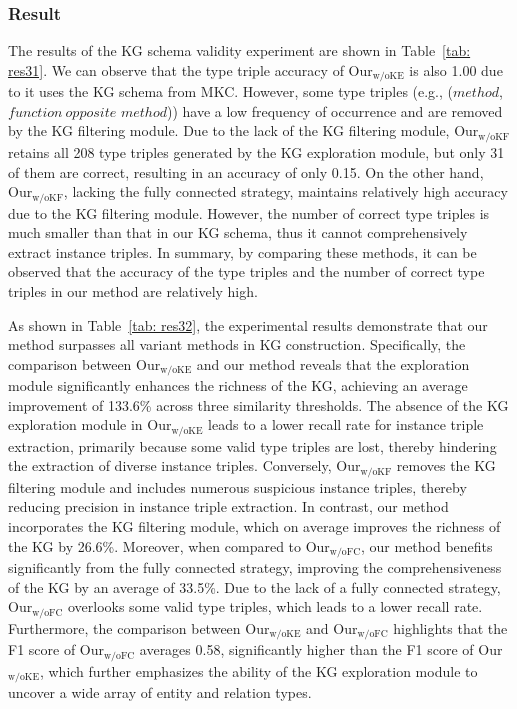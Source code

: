 \subsubsection{Result}
The results of the KG schema validity experiment are shown in Table~\ref{tab: res31}.
We can observe that the type triple accuracy of Our$_{\text{w/oKE}}$ is also 1.00 due to it uses the KG schema from MKC.
However, some type triples (e.g., ($method$, $function\ opposite$ $method$)) have a low frequency of occurrence and are removed by the KG filtering module. 
Due to the lack of the KG filtering module, Our$_{\text{w/oKF}}$ retains all 208 type triples generated by the KG exploration module, but only 31 of them are correct, resulting in an accuracy of only 0.15.
On the other hand, Our$_{\text{w/oKF}}$, lacking the fully connected strategy, maintains relatively high accuracy due to the KG filtering module.
However, the number of correct type triples is much smaller than that in our KG schema, thus it cannot comprehensively extract instance triples.
In summary, by comparing these methods, it can be observed that the accuracy of the type triples and the number of correct type triples in our method are relatively high.

As shown in Table~\ref{tab: res32}, the experimental results demonstrate that our method surpasses all variant methods in KG construction.
Specifically, the comparison between Our$_{\text{w/oKE}}$ and our method reveals that the exploration module significantly enhances the richness of the KG, achieving an average improvement of 133.6\% across three similarity thresholds.
The absence of the KG exploration module in Our$_{\text{w/oKE}}$ leads to a lower recall rate for instance triple extraction, primarily because some valid type triples are lost, thereby hindering the extraction of diverse instance triples.
Conversely, Our$_{\text{w/oKF}}$ removes the KG filtering module and includes numerous suspicious instance triples, thereby reducing precision in instance triple extraction.
In contrast, our method incorporates the KG filtering module, which on average improves the richness of the KG by 26.6\%.
Moreover, when compared to Our$_{\text{w/oFC}}$, our method benefits significantly from the fully connected strategy, improving the comprehensiveness of the KG by an average of 33.5\%.
Due to the lack of a fully connected strategy, Our$_{\text{w/oFC}}$ overlooks some valid type triples, which leads to a lower recall rate.
Furthermore, the comparison between Our$_{\text{w/oKE}}$ and Our$_{\text{w/oFC}}$ highlights that the F1 score of Our$_{\text{w/oFC}}$ averages 0.58, significantly higher than the F1 score of Our$_{\text{w/oKE}}$, which further emphasizes the ability of the KG exploration module to uncover a wide array of entity and relation types.

